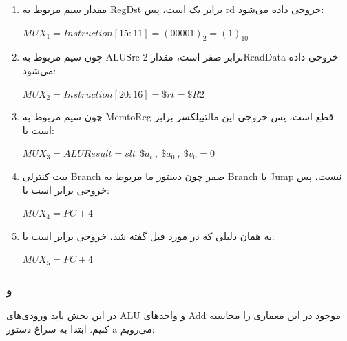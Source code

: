 \begin{enumerate}
		\item 
مقدار سیم مربوط به RegDst برابر یک است، پس rd خروجی داده می‌شود:
	\setLTR
	
	$MUX_1 = Instruction[15:11]=(00001)_2 = (1)_{10}$
	
	\setRTL
	
		\item 
چون سیم مربوط به ALUSrc برابر صفر است، مقدار 2ReadData خروجی داده می‌شود:
\setLTR

$MUX_2 = Instruction[20:16]= \$rt = \$R2 $

\setRTL	
	
			\item 
	چون سیم مربوط به MemtoReg قطع است، پس خروجی این مالتیپلکسر برابر است با:
	\setLTR
	
	$MUX_3 = ALUResult =slt \ \ \$a_t \ ,\ \$a_0 \ , \ \$v_0 = 0$
	
	\setRTL	
	
				\item 
بیت کنترلی Branch صفر چون دستور ما مربوط به Branch یا Jump نیست، پس خروجی برابر است با:
	\setLTR
	
	$MUX_4 = PC + 4$
	
	\setRTL	
	
			\item 
به همان دلیلی که در مورد قبل گفته شد، خروجی برابر است با:
	\setLTR
	
	$MUX_5 = PC + 4$
	
	\setRTL	
\end{enumerate}

\subsubsection*{و}

در این بخش باید ورودی‌های ALU و واحدهای Add موجود در این معماری را محاسبه کنیم. ابتدا به سراغ دستور a می‌رویم:

